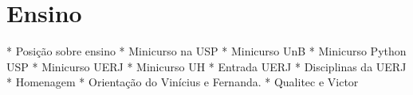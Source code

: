 \section{Ensino}

* Posição sobre ensino
* Minicurso na USP
* Minicurso UnB
* Minicurso Python USP
* Minicurso UERJ
* Minicurso UH
* Entrada UERJ
* Disciplinas da UERJ
* Homenagem
* Orientação do Vinícius e Fernanda.
* Qualitec e Victor
